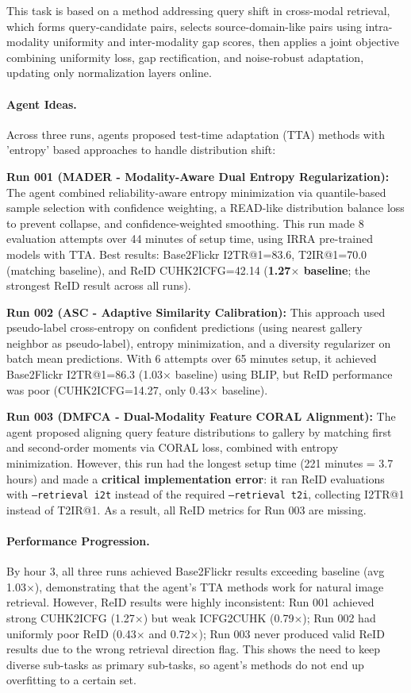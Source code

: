 \documentclass[11pt]{article}
\let\oldtexttt\texttt
\renewcommand{\texttt}[1]{{\fontseries{m}\selectfont\oldtexttt{#1}}}
\theoremstyle{plain}
\theoremstyle{definition}
\theoremstyle{remark}
\begin{document}
This task is based on a method addressing query shift in cross-modal retrieval, which forms query-candidate pairs, selects source-domain-like pairs using intra-modality uniformity and inter-modality gap scores, then applies a joint objective combining uniformity loss, gap rectification, and noise-robust adaptation, updating only normalization layers online.

\paragraph{Agent Ideas.} Across three runs, agents proposed test-time adaptation (TTA) methods with 'entropy' based approaches to handle distribution shift:

\textbf{Run 001 (MADER - Modality-Aware Dual Entropy Regularization):} The agent combined reliability-aware entropy minimization via quantile-based sample selection with confidence weighting, a READ-like distribution balance loss to prevent collapse, and confidence-weighted smoothing. This run made 8 evaluation attempts over 44 minutes of setup time, using IRRA pre-trained models with TTA. Best results: Base2Flickr I2TR@1=83.6, T2IR@1=70.0 (matching baseline), and ReID CUHK2ICFG=42.14 (\textbf{1.27$\times$ baseline}; the strongest ReID result across all runs).

\textbf{Run 002 (ASC - Adaptive Similarity Calibration):} This approach used pseudo-label cross-entropy on confident predictions (using nearest gallery neighbor as pseudo-label), entropy minimization, and a diversity regularizer on batch mean predictions. With 6 attempts over 65 minutes setup, it achieved Base2Flickr I2TR@1=86.3 (1.03$\times$ baseline) using BLIP, but ReID performance was poor (CUHK2ICFG=14.27, only 0.43$\times$ baseline).

\textbf{Run 003 (DMFCA - Dual-Modality Feature CORAL Alignment):} The agent proposed aligning query feature distributions to gallery by matching first and second-order moments via CORAL loss, combined with entropy minimization. However, this run had the longest setup time (221 minutes = 3.7 hours) and made a \textbf{critical implementation error}: it ran ReID evaluations with \texttt{--retrieval i2t} instead of the required \texttt{--retrieval t2i}, collecting I2TR@1 instead of T2IR@1. As a result, all ReID metrics for Run 003 are missing.

\paragraph{Performance Progression.} By hour 3, all three runs achieved Base2Flickr results exceeding baseline (avg 1.03$\times$), demonstrating that the agent's TTA methods work for natural image retrieval. However, ReID results were highly inconsistent: Run 001 achieved strong CUHK2ICFG (1.27$\times$) but weak ICFG2CUHK (0.79$\times$); Run 002 had uniformly poor ReID (0.43$\times$ and 0.72$\times$); Run 003 never produced valid ReID results due to the wrong retrieval direction flag. This shows the need to keep diverse sub-tasks as primary sub-tasks, so agent's methods do not end up overfitting to a certain set.
\end{document}
